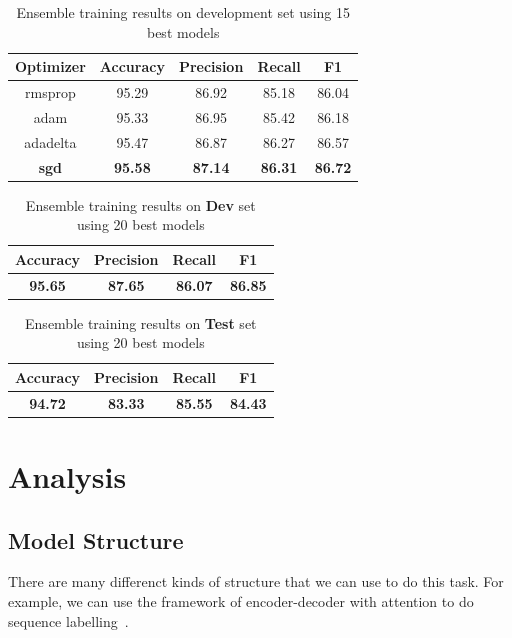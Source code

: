 \documentclass{article}
\begin{document}
\begin{table}[tbh]
    \caption{Ensemble training results on development set using 15 best models}
    \label{tab:ensemble}
    \centering
    \begin{tabular}{c | c | c | c | c}
        \hline
        Optimizer & Accuracy & Precision & Recall & F1 \\
        \hline
        rmsprop & 95.29 & 86.92 & 85.18 & 86.04 \\
        \hline
        adam & 95.33 & 86.95 & 85.42 & 86.18 \\
        \hline
        adadelta & 95.47 & 86.87 & 86.27 & 86.57 \\
        \hline
        \bf{sgd} & \bf{95.58} & \bf{87.14} & \bf{86.31} & \bf{86.72} \\
        \hline
    \end{tabular}
\end{table}

\begin{table}[tbh]
    \caption{Ensemble training results on \textbf{Dev} set using 20 best models}
    \label{tab:best}
    \centering
    \begin{tabular}{c | c | c | c}
        \hline
        Accuracy & Precision & Recall & F1 \\
        \hline
        \bf{95.65} & \bf{87.65} & \bf{86.07} & \bf{86.85} \\
        \hline
    \end{tabular}
\end{table}

\begin{table}[tbh]
    \caption{Ensemble training results on \textbf{Test} set using 20 best models}
    \label{tab:final}
    \centering
    \begin{tabular}{c | c | c | c}
        \hline
        Accuracy & Precision & Recall & F1 \\
        \hline
        \bf{94.72} & \bf{83.33} & \bf{85.55} & \bf{84.43} \\
        \hline
    \end{tabular}
\end{table}

\section{Analysis}
\subsection{Model Structure}
There are many differenct kinds of structure that we can use to do this task. 
For example, we can use the framework of encoder-decoder with attention to do sequence labelling~\cite{s2sner}.
\end{document}
